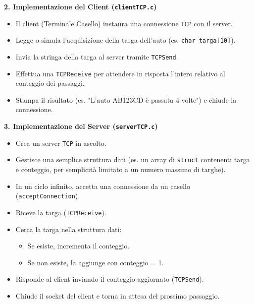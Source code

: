 \documentclass[11pt]{article}
\begin{document}
\begin{tcolorbox}[colback=green!5!white,colframe=green!75!black,title=\textbf{RISPOSTA}, breakable]
\textbf{2. Implementazione del Client (\texttt{clientTCP.c})}
\begin{itemize}
    \item Il client (Terminale Casello) instaura una connessione \texttt{TCP} con il server.
    \item Legge o simula l'acquisizione della targa dell'auto (es. \texttt{char targa[10]}).
    \item Invia la stringa della targa al server tramite \texttt{TCPSend}.
    \item Effettua una \texttt{TCPReceive} per attendere in risposta l'intero relativo al conteggio dei passaggi.
    \item Stampa il risultato (es. "L'auto AB123CD è passata 4 volte") e chiude la connessione.
\end{itemize}

\textbf{3. Implementazione del Server (\texttt{serverTCP.c})}
\begin{itemize}
    \item Crea un server \texttt{TCP} in ascolto.
    \item Gestisce una semplice struttura dati (es. un array di \texttt{struct} contenenti targa e conteggio, per semplicità limitato a un numero massimo di targhe).
    \item In un ciclo infinito, accetta una connessione da un casello (\texttt{acceptConnection}).
    \item Riceve la targa (\texttt{TCPReceive}).
    \item Cerca la targa nella struttura dati:
    \begin{itemize}
        \item Se esiste, incrementa il conteggio.
        \item Se non esiste, la aggiunge con conteggio = 1.
    \end{itemize}
    \item Risponde al client inviando il conteggio aggiornato (\texttt{TCPSend}).
    \item Chiude il socket del client e torna in attesa del prossimo passaggio.
\end{itemize}
\end{tcolorbox}
\end{document}
